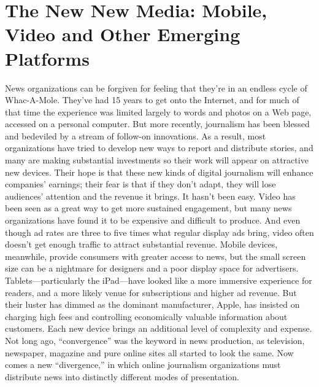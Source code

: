 \chapter{The New New Media: Mobile, Video and Other Emerging Platforms}
News organizations can be forgiven for feeling that they’re in an endless cycle
of Whac-A-Mole.
They’ve had 15 years to get onto the Internet, and for much of that time the
experience was limited largely to words and photos on a Web page, accessed on
a personal computer. But more recently, journalism has been blessed and bedeviled
by a stream of follow-on innovations. As a result, most organizations have
tried to develop new ways to report and distribute stories, and many are making
substantial investments so their work will appear on attractive new devices. Their
hope is that these new kinds of digital journalism will enhance companies’ earnings;
their fear is that if they don’t adapt, they will lose audiences’ attention and
the revenue it brings.
It hasn’t been easy. Video has been seen as a great way to get more sustained
engagement, but many news organizations have found it to be expensive and difficult
to produce. And even though ad rates are three to five times what regular
display ads bring, video often doesn’t get enough traffic to attract substantial revenue.
Mobile devices, meanwhile, provide consumers with greater access to news,
but the small screen size can be a nightmare for designers and a poor display space
for advertisers. Tablets—particularly the iPad—have looked like a more immersive
experience for readers, and a more likely venue for subscriptions and higher
ad revenue. But their luster has dimmed as the dominant manufacturer, Apple, has
insisted on charging high fees and controlling economically valuable information
about customers. Each new device brings an additional level of complexity and
expense. Not long ago, ``convergence'' was the keyword in news production, as
television, newspaper, magazine and pure online sites all started to look the same.
Now comes a new ``divergence,'' in which online journalism organizations must
distribute news into distinctly different modes of presentation.

